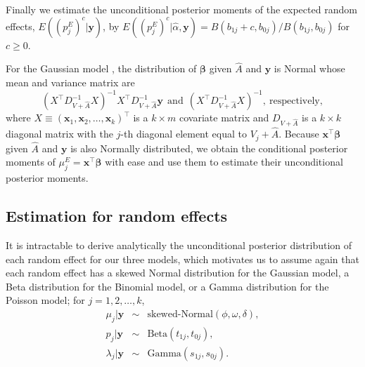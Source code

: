 \documentclass[article]{jss}
\begin{document}
Finally we estimate the unconditional posterior moments of the expected random effects, $E((p^E_{j})^c\vert\boldsymbol{y})$, by $E((p^E_{j})^c\vert\hat{\alpha}, \boldsymbol{y})=B(b_{1j} + c, b_{0j})/B(b_{1j}, b_{0j})$ for $c\ge0$.


For the Gaussian model \citep{tang2011}, the distribution of $\boldsymbol{\beta}$ given $\hat{A}$ and $\boldsymbol{y}$ is Normal whose mean and variance matrix are
\begin{equation}
(X^\top D^{-1}_{V+\hat{A}} X)^{-1}X^\top D^{-1}_{V+\hat{A}}\boldsymbol{y}~~ \textrm{and}~~ (X^\top D^{-1}_{V+\hat{A}} X)^{-1}, ~\textrm{respectively},
\end{equation}
where $X\equiv (\boldsymbol{x}_1, \boldsymbol{x}_2, \ldots, \boldsymbol{x}_k)^\top$ is a $k \times m$ covariate matrix and $D_{V+\hat{A}}$ is a $k \times k$ diagonal matrix with the $j$-th diagonal element equal to $V_j+\hat{A}$. Because $\boldsymbol{x}^\top\boldsymbol{\beta}$ given $\hat{A}$ and $\boldsymbol{y}$ is also Normally distributed, we obtain the conditional posterior moments of $\mu^E_j=\boldsymbol{x}^\top\boldsymbol{\beta}$ with ease and use them to estimate their unconditional posterior moments.


\subsection{Estimation for random effects}
It is intractable to derive analytically the unconditional posterior distribution of each random effect  for our three models, which motivates us to assume again that each random effect has a skewed Normal distribution \citep{azzalini1985class} for the Gaussian model, a Beta distribution for the Binomial model, or a Gamma distribution for the Poisson model; for $j=1, 2, \ldots, k$,
\begin{eqnarray}
\mu_j\vert\boldsymbol{y} &\sim& \textrm{skewed-Normal}(\phi, \omega, \delta),\label{skewnormal}\\
p_j\vert \boldsymbol{y} &\sim& \textrm{Beta}(t_{1j}, t_{0j}),\label{betapost}\\
\lambda_j\vert \boldsymbol{y} &\sim& \textrm{Gamma}(s_{1j}, s_{0j}).\label{gammapost}
\end{eqnarray}
\end{document}
